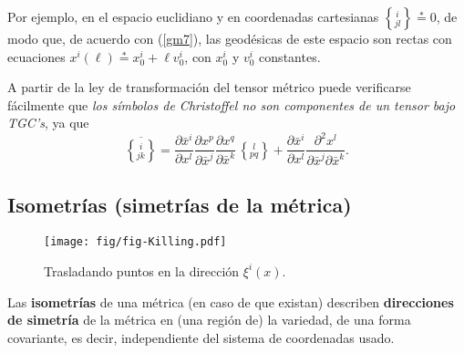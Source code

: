 Por ejemplo, en el espacio euclidiano y en coordenadas cartesianas
$\left\{_{ j l}^{\, i}\right\}\overset{\ast}{=}0$, de modo que, de acuerdo con
(\ref{gm7}), las geodésicas de este espacio son rectas con ecuaciones
$x^i (\ell)\overset{\ast}{=}x_0^i +\ell v_0^i $, con $x_0^i $ y $v_0^i$ constantes.

A partir de la ley de transformación del tensor métrico puede verificarse fácilmente que \textit{los símbolos de Christoffel no son componentes de un tensor bajo TGC's}, ya que
\begin{equation}
\overline{\left\{_{j k}^{\,\, i}\right\}}=\frac{\partial\bar{x}^i}{\partial x^l}\frac{\partial
x^p}{\partial\bar{x}^j}\frac{\partial x^q}{\partial\bar{x}^k}\,
\left\{_{p q}^{\,\, l}\right\} +\frac{\partial\bar{x}^i}{\partial x^l}\frac{\partial
^2x^l}{\partial\bar{x}^j \partial\bar{x}^k}. \label{dinv7}
\end{equation}

\subsection{Isometrías (simetrías de la métrica)}
\begin{center}
\begin{figure}[H]
\centerline{\texttt{[image: fig/fig-Killing.pdf]}}
\caption{Trasladando puntos en la dirección $\xi^i(x)$.}
\label{fig:Killing}
\end{figure}
\end{center}
Las \textbf{isometrías} de una métrica (en caso de que existan) describen \textbf{direcciones de simetría} de la métrica en (una región de) la variedad, de una forma covariante, es decir, independiente del sistema de coordenadas usado. 

